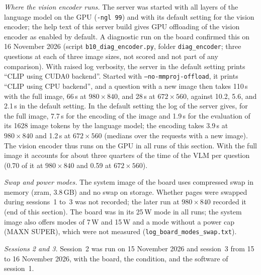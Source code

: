 \documentclass[10pt]{article}
\begin{document}
\emph{Where the vision encoder runs.} The server was started with all layers of the language model on the GPU (\texttt{-ngl 99}) and with its default setting for the vision encoder; the help text of this server build gives GPU offloading of the vision encoder as enabled by default. A diagnostic run on the board confirmed this on 16 November 2026 (script \texttt{b10\_diag\_encoder.py}, folder \texttt{diag\_encoder}; three questions at each of three image sizes, not scored and not part of any comparison). With raised log verbosity, the server in the default setting prints ``CLIP using CUDA0 backend''. Started with \texttt{--no-mmproj-offload}, it prints ``CLIP using CPU backend'', and a question with a new image then takes 110\,s with the full image, 66\,s at $980\times840$, and 28\,s at $672\times560$, against 10.2, 5.6, and 2.1\,s in the default setting. In the default setting the log of the server gives, for the full image, 7.7\,s for the encoding of the image and 1.9\,s for the evaluation of its 1628 image tokens by the language model; the encoding takes 3.9\,s at $980\times840$ and 1.2\,s at $672\times560$ (medians over the requests with a new image). The vision encoder thus runs on the GPU in all runs of this section. With the full image it accounts for about three quarters of the time of the VLM per question (0.70 of it at $980\times840$ and 0.59 at $672\times560$). \par \emph{Swap and power modes.} The system image of the board uses compressed swap in memory (zram, 3.8\,GB) and no swap on storage. Whether pages were swapped during sessions~1 to~3 was not recorded; the later run at $980\times840$ recorded it (end of this section). The board was in its 25\,W mode in all runs; the system image also offers modes of 7\,W and 15\,W and a mode without a power cap (MAXN SUPER), which were not measured (\texttt{log\_board\_modes\_swap.txt}).

\emph{Sessions 2 and 3.} Session~2 was run on 15 November 2026 and session~3 from 15 to 16 November 2026, with the board, the condition, and the software of session~1.
\end{document}
